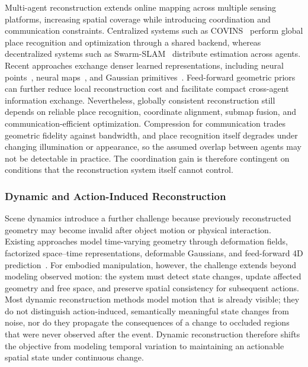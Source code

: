 \documentclass{SCIS2026}
\begin{document}
Multi-agent reconstruction extends online mapping across multiple sensing platforms, increasing spatial coverage while introducing coordination and communication constraints. Centralized systems such as COVINS~\cite{schmuck2021covins} perform global place recognition and optimization through a shared backend, whereas decentralized systems such as Swarm-SLAM~\cite{lajoie2023swarm} distribute estimation across agents. Recent approaches exchange denser learned representations, including neural points~\cite{hu2023cp}, neural maps~\cite{deng2025mne}, and Gaussian primitives~\cite{yugay2025magic}. Feed-forward geometric priors can further reduce local reconstruction cost and facilitate compact cross-agent information exchange. Nevertheless, globally consistent reconstruction still depends on reliable place recognition, coordinate alignment, submap fusion, and communication-efficient optimization. Compression for communication trades geometric fidelity against bandwidth, and place recognition itself degrades under changing illumination or appearance, so the assumed overlap between agents may not be detectable in practice. The coordination gain is therefore contingent on conditions that the reconstruction system itself cannot control.

\subsubsection{Dynamic and Action-Induced Reconstruction}

Scene dynamics introduce a further challenge because previously reconstructed geometry may become invalid after object motion or physical interaction. Existing approaches model time-varying geometry through deformation fields, factorized space--time representations, deformable Gaussians, and feed-forward 4D prediction~\cite{newcombe2015dynamicfusion,pumarola2021d,fridovich2023k,yang2024deformable,luiten2024dynamic,zhang2026efficiently}. For embodied manipulation, however, the challenge extends beyond modeling observed motion: the system must detect state changes, update affected geometry and free space, and preserve spatial consistency for subsequent actions. Most dynamic reconstruction methods model motion that is already visible; they do not distinguish action-induced, semantically meaningful state changes from noise, nor do they propagate the consequences of a change to occluded regions that were never observed after the event. Dynamic reconstruction therefore shifts the objective from modeling temporal variation to maintaining an actionable spatial state under continuous change.
\end{document}
